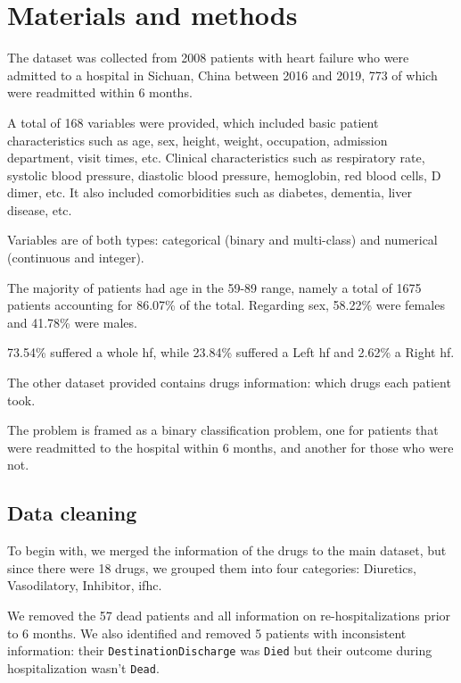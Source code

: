 \section{Materials and methods}\label{sec:materials-methods}

The dataset was collected from \num{2008} patients with heart failure who were admitted to a hospital in Sichuan, China between 2016 and 2019, 773 of which were readmitted within 6 months.

A total of 168 variables were provided, which included basic patient characteristics such as age, sex, height, weight, occupation, admission department, visit times, etc. Clinical characteristics such as respiratory rate, systolic blood pressure, diastolic blood pressure, hemoglobin, red blood cells, D dimer, etc. It also included comorbidities such as diabetes, dementia, liver disease, etc.

Variables are of both types: categorical (binary and multi-class) and numerical (continuous and integer).

The majority of patients had age in the 59-89 range, namely a total of 1675 patients accounting for 86.07\% of the total. Regarding sex, 58.22\% were females and 41.78\% were males.

73.54\% suffered a whole \gls{hf}, while 23.84\% suffered a Left \gls{hf} and 2.62\% a Right \gls{hf}.

The other dataset provided contains drugs information: which drugs each patient took.

The problem is framed as a binary classification problem, one for patients that were readmitted to the hospital within 6 months, and another for those who were not.

\subsection{Data cleaning}\label{sec:data-cleaning}

To begin with, we merged the information of the drugs to the main dataset, but since there were 18 drugs, we grouped them into four categories: Diuretics, Vasodilatory, Inhibitor, \gls{ifhc}.

We removed the 57 dead patients and all information on re-hospitalizations prior to 6 months. We also identified and removed 5 patients with inconsistent information: their \texttt{DestinationDischarge} was \texttt{Died} but their outcome during hospitalization wasn't \texttt{Dead}.

